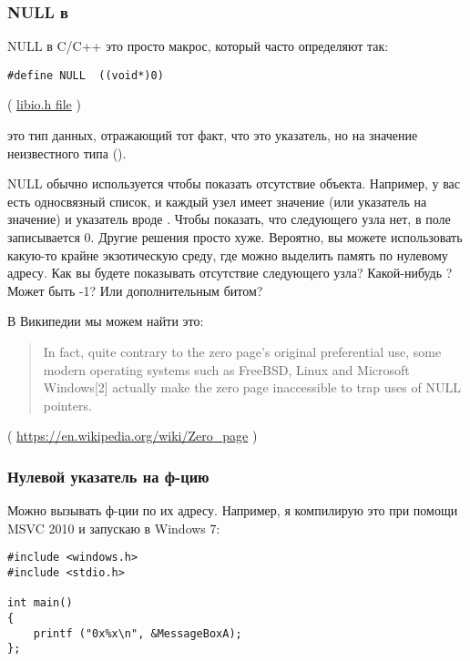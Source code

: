 \subsubsection{NULL в \CCpp}

NULL в C/C++ это просто макрос, который часто определяют так:

\begin{lstlisting}[style=customc]
#define NULL  ((void*)0)
\end{lstlisting}
( \href{https://github.com/wzhy90/linaro_toolchains/blob/8ff8ae680bac04558d10cc9626e12c4c2f6c1348/arm-cortex_a15-linux-gnueabihf/libc/usr/include/libio.h#L70}{libio.h file} )

 это тип данных, отражающий тот факт, что это указатель, но на значение неизвестного типа ().

NULL обычно используется чтобы показать отсутствие объекта.
Например, у вас есть односвязный список, и каждый узел имеет значение (или указатель на значение) и указатель вроде .
Чтобы показать, что следующего узла нет, в поле  записывается 0.
Другие решения просто хуже.
Вероятно, вы можете использовать какую-то крайне экзотическую среду, где можно выделить память по нулевому адресу.
Как вы будете показывать отсутствие следующего узла?
Какой-нибудь ? Может быть -1? Или дополнительным битом?

В Википедии мы можем найти это:

\begin{framed}
\begin{quotation}
In fact, quite contrary to the zero page's original preferential use, some modern operating systems such as FreeBSD, Linux and Microsoft Windows[2] actually make the zero page inaccessible to trap uses of NULL pointers. 
\end{quotation}
\end{framed}
( \url{https://en.wikipedia.org/wiki/Zero_page} )

\subsubsection{Нулевой указатель на ф-цию}

Можно вызывать ф-ции по их адресу.
Например, я компилирую это при помощи MSVC 2010 и запускаю в Windows 7:

\begin{lstlisting}[style=customc]
#include <windows.h>
#include <stdio.h>

int main()
{
	printf ("0x%x\n", &MessageBoxA);
};
\end{lstlisting}

